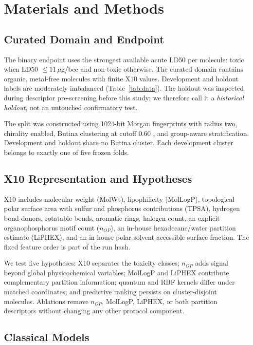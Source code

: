 \documentclass[conference]{IEEEtran}
\begin{document}
\section{Materials and Methods}

\subsection{Curated Domain and Endpoint}

The binary endpoint uses the strongest available acute LD50 per molecule:
toxic when LD50 $\leq 11\,\mu$g/bee and non-toxic otherwise. The curated domain
contains organic, metal-free molecules with finite X10 values. Development and
holdout labels are moderately imbalanced (Table~\ref{tab:data}). The holdout
was inspected during descriptor pre-screening before this study; we therefore
call it a \emph{historical holdout}, not an untouched confirmatory test.



The split was constructed using 1024-bit Morgan fingerprints with radius two,
chirality enabled, Butina clustering at cutoff 0.60
\cite{butina1999unsupervised}, and group-aware stratification. Development and
holdout share no Butina cluster. Each development cluster belongs to exactly
one of five frozen folds.

\subsection{X10 Representation and Hypotheses}

X10 includes molecular weight (MolWt), lipophilicity (MolLogP), topological
polar surface area with sulfur and phosphorus contributions (TPSA), hydrogen
bond donors, rotatable bonds, aromatic rings, halogen count, an explicit
organophosphorus motif count ($n_{OP}$), an in-house hexadecane/water partition
estimate (LiPHEX), and an in-house polar solvent-accessible surface fraction.
The fixed feature order is part of the run hash.

We test five hypotheses: X10 separates the toxicity classes; $n_{OP}$ adds
signal beyond global physicochemical variables; MolLogP and LiPHEX contribute
complementary partition information; quantum and RBF kernels differ under
matched coordinates; and predictive ranking persists on cluster-disjoint
molecules. Ablations remove $n_{OP}$, MolLogP, LiPHEX, or both partition
descriptors without changing any other protocol component.

\subsection{Classical Models}
\end{document}
